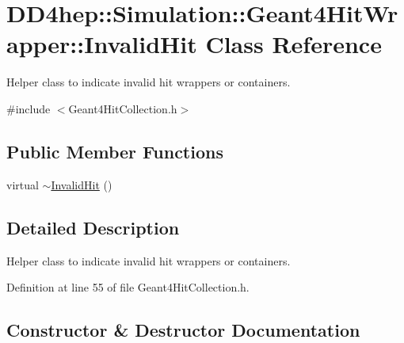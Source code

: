 \hypertarget{class_d_d4hep_1_1_simulation_1_1_geant4_hit_wrapper_1_1_invalid_hit}{}\section{D\+D4hep\+:\+:Simulation\+:\+:Geant4\+Hit\+Wrapper\+:\+:Invalid\+Hit Class Reference}
\label{class_d_d4hep_1_1_simulation_1_1_geant4_hit_wrapper_1_1_invalid_hit}


Helper class to indicate invalid hit wrappers or containers.  




{\ttfamily \#include $<$Geant4\+Hit\+Collection.\+h$>$}

\subsection*{Public Member Functions}
\begin{DoxyCompactItemize}
\item 
virtual \hyperlink{class_d_d4hep_1_1_simulation_1_1_geant4_hit_wrapper_1_1_invalid_hit_aa4c520e4b27309eb6423b301b73608a4}{$\sim$\+Invalid\+Hit} ()
\end{DoxyCompactItemize}


\subsection{Detailed Description}
Helper class to indicate invalid hit wrappers or containers. 

Definition at line 55 of file Geant4\+Hit\+Collection.\+h.



\subsection{Constructor \& Destructor Documentation}
\hypertarget{class_d_d4hep_1_1_simulation_1_1_geant4_hit_wrapper_1_1_invalid_hit_aa4c520e4b27309eb6423b301b73608a4}{}\label{class_d_d4hep_1_1_simulation_1_1_geant4_hit_wrapper_1_1_invalid_hit_aa4c520e4b27309eb6423b301b73608a4} 
